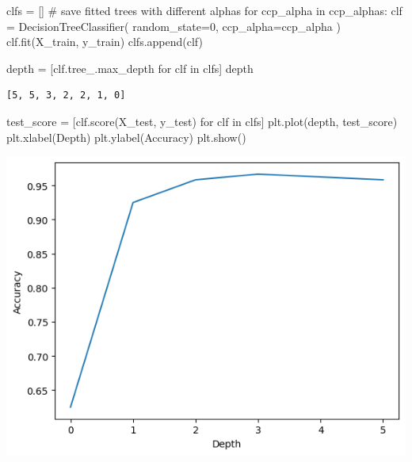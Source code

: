 \documentclass[
  11pt,
  letterpaper,
  DIV=11,
  numbers=noendperiod]{scrartcl}
\newenvironment{Shaded}{\begin{snugshade}}{\end{snugshade}}
\newcommand{\CommentTok}[1]{\textcolor[rgb]{0.37,0.37,0.37}{#1}}
\newcommand{\ControlFlowTok}[1]{\textcolor[rgb]{0.00,0.23,0.31}{#1}}
\newcommand{\DecValTok}[1]{\textcolor[rgb]{0.68,0.00,0.00}{#1}}
\newcommand{\KeywordTok}[1]{\textcolor[rgb]{0.00,0.23,0.31}{#1}}
\newcommand{\NormalTok}[1]{\textcolor[rgb]{0.00,0.23,0.31}{#1}}
\newcommand{\OperatorTok}[1]{\textcolor[rgb]{0.37,0.37,0.37}{#1}}
\newcommand{\StringTok}[1]{\textcolor[rgb]{0.13,0.47,0.30}{#1}}
\begin{document}
\begin{Shaded}
\begin{Highlighting}[]
\NormalTok{clfs }\OperatorTok{=}\NormalTok{ [] }\CommentTok{\# save fitted trees with different alphas}
\ControlFlowTok{for}\NormalTok{ ccp\_alpha }\KeywordTok{in}\NormalTok{ ccp\_alphas:}
\NormalTok{    clf }\OperatorTok{=}\NormalTok{ DecisionTreeClassifier(}
\NormalTok{        random\_state}\OperatorTok{=}\DecValTok{0}\NormalTok{, }
\NormalTok{        ccp\_alpha}\OperatorTok{=}\NormalTok{ccp\_alpha}
\NormalTok{        )}
\NormalTok{    clf.fit(X\_train, y\_train)}
\NormalTok{    clfs.append(clf)}
\end{Highlighting}
\end{Shaded}

\begin{Shaded}
\begin{Highlighting}[]
\NormalTok{depth }\OperatorTok{=}\NormalTok{ [clf.tree\_.max\_depth }\ControlFlowTok{for}\NormalTok{ clf }\KeywordTok{in}\NormalTok{ clfs]}
\NormalTok{depth}
\end{Highlighting}
\end{Shaded}

\begin{verbatim}
[5, 5, 3, 2, 2, 1, 0]
\end{verbatim}

\begin{Shaded}
\begin{Highlighting}[]
\NormalTok{test\_score }\OperatorTok{=}\NormalTok{ [clf.score(X\_test, y\_test) }\ControlFlowTok{for}\NormalTok{ clf }\KeywordTok{in}\NormalTok{ clfs]}
\NormalTok{plt.plot(depth, test\_score)}
\NormalTok{plt.xlabel(}\StringTok{\textquotesingle{}Depth\textquotesingle{}}\NormalTok{)}
\NormalTok{plt.ylabel(}\StringTok{\textquotesingle{}Accuracy\textquotesingle{}}\NormalTok{)}
\NormalTok{plt.show()}
\end{Highlighting}
\end{Shaded}

\includegraphics{Assignment6_Final version_files/figure-pdf/cell-31-output-1.png}
\end{document}
